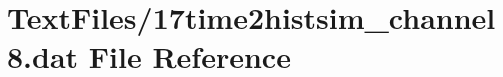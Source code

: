 \hypertarget{17time2histsim__channel8_8dat}{}\section{Text\+Files/17time2histsim\+\_\+channel8.dat File Reference}
\label{17time2histsim__channel8_8dat}
